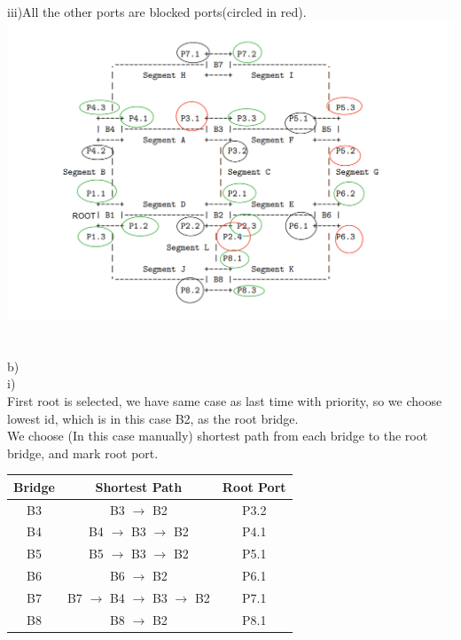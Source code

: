 \documentclass[a4paper]{article}
\begin{document}
\\\\
iii)All the other ports are blocked ports(circled in red).\\
\includegraphics[scale=0.2]{aww-board-3.png}\\
\\
\\
b)
\\
i)\\
First root is selected, we have same case as last time with priority, so we choose lowest id, which is in this case B2, as the root bridge.\\
We choose (In this case manually) shortest path from each bridge to the root bridge, and mark root port.
\\
\begin{tabular}{|c|c|c|}
\hline
Bridge & Shortest Path & Root Port\\\hline
B3 & B3 $\rightarrow$ B2 & P3.2\\\hline
B4 & B4 $\rightarrow$ B3 $\rightarrow$ B2 & P4.1\\\hline
B5 & B5 $\rightarrow$ B3 $\rightarrow$ B2 & P5.1\\\hline
B6 & B6 $\rightarrow$ B2 & P6.1\\\hline
B7 & B7 $\rightarrow$ B4 $\rightarrow$ B3 $\rightarrow$ B2 & P7.1\\\hline
B8 & B8 $\rightarrow$ B2 & P8.1\\\hline

\end{tabular}\\
\end{document}
